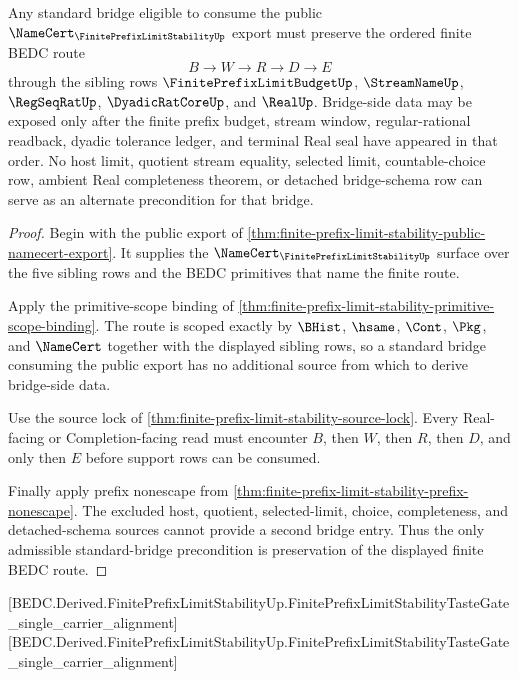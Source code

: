 \begin{theorem}
\label{thm:finite-prefix-limit-stability-standard-bridge-precondition}
Any standard bridge eligible to consume the public $\NameCert_{\FinitePrefixLimitStabilityUp}$ export must preserve the ordered finite BEDC route
$$
B \to W \to R \to D \to E
$$
through the sibling rows $\FinitePrefixLimitBudgetUp$, $\StreamNameUp$, $\RegSeqRatUp$, $\DyadicRatCoreUp$, and $\RealUp$. Bridge-side data may be exposed only after the finite prefix budget, stream window, regular-rational readback, dyadic tolerance ledger, and terminal Real seal have appeared in that order. No host limit, quotient stream equality, selected limit, countable-choice row, ambient Real completeness theorem, or detached bridge-schema row can serve as an alternate precondition for that bridge.
\end{theorem}
\begin{proof}
Begin with the public export of \autoref{thm:finite-prefix-limit-stability-public-namecert-export}. It supplies the $\NameCert_{\FinitePrefixLimitStabilityUp}$ surface over the five sibling rows and the BEDC primitives that name the finite route.

Apply the primitive-scope binding of \autoref{thm:finite-prefix-limit-stability-primitive-scope-binding}. The route is scoped exactly by $\BHist$, $\hsame$, $\Cont$, $\Pkg$, and $\NameCert$ together with the displayed sibling rows, so a standard bridge consuming the public export has no additional source from which to derive bridge-side data.

Use the source lock of \autoref{thm:finite-prefix-limit-stability-source-lock}. Every Real-facing or Completion-facing read must encounter $B$, then $W$, then $R$, then $D$, and only then $E$ before support rows can be consumed.

Finally apply prefix nonescape from \autoref{thm:finite-prefix-limit-stability-prefix-nonescape}. The excluded host, quotient, selected-limit, choice, completeness, and detached-schema sources cannot provide a second bridge entry. Thus the only admissible standard-bridge precondition is preservation of the displayed finite BEDC route.
\end{proof}

[BEDC.Derived.FinitePrefixLimitStabilityUp.FinitePrefixLimitStabilityTasteGate\_single\_carrier\_alignment]
[BEDC.Derived.FinitePrefixLimitStabilityUp.FinitePrefixLimitStabilityTasteGate\_single\_carrier\_alignment]

